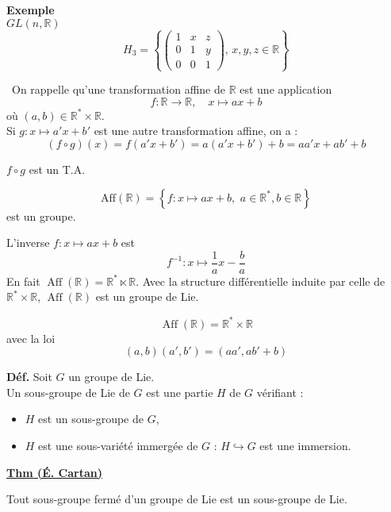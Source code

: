 \documentclass[11pt,a4paper]{article}
\begin{document}
	\medskip
	
	\noindent
	\textbf{Exemple} \\
	$GL(n, \mathbb{R})$ \\
	\[
	H_3 = \left\lbrace
	\begin{pmatrix}
		1 & x & z \\
		0 & 1 & y \\
		0 & 0 & 1
	\end{pmatrix} ,\, x, y, z \in \mathbb{R}
	\right\rbrace
	\]
	\medskip
	
	\noindent
	\textasteriskcentered~On rappelle qu'une transformation affine de $\mathbb{R}$ est une application
	\[
	f : \mathbb{R} \longrightarrow \mathbb{R}, \quad x \mapsto ax + b
	\]
	où $(a, b) \in \mathbb{R}^* \times \mathbb{R}$.
	\\
	Si $g : x \mapsto a'x + b'$ est une autre transformation affine, on a :
	\[
	(f \circ g)(x) = f(a'x + b') = a(a'x + b') + b = aa'x + ab' + b
	\]
	\medskip
	
	$f \circ g$ est un T.A.
	
	\[
	\text{Aff}(\mathbb{R}) = \left\lbrace f : x \mapsto ax + b,\,\, a \in \mathbb{R}^*, b \in \mathbb{R} \right\rbrace
	\]
	est un groupe.
	
	L'inverse $f : x \mapsto a x + b$ est
	\[
	f^{-1} : x \mapsto \frac{1}{a}x - \frac{b}{a}
	\]
	En fait $\operatorname{Aff}(\mathbb{R}) = \mathbb{R}^* \ltimes \mathbb{R}$. Avec la structure différentielle induite par celle de $\mathbb{R}^* \times \mathbb{R}$, $\operatorname{Aff}(\mathbb{R})$ est un groupe de Lie.
	
	\[
	\operatorname{Aff}(\mathbb{R}) = \mathbb{R}^* \times \mathbb{R}
	\]
	avec la loi
	\[
	(a, b) (a', b') = (a a', a b' + b)
	\]
	
	\textbf{Déf.} Soit $G$ un groupe de Lie.\\
	Un sous-groupe de Lie de $G$ est une partie $H$ de $G$ vérifiant :
	\begin{itemize}
		\item $H$ est un sous-groupe de $G$,
		\item $H$ est une sous-variété immergée de $G$ : $H \hookrightarrow G$ est une immersion.
	\end{itemize}
	
	\textbf{\underline{Thm (É. Cartan)}}
	
	\vspace{1em}
	
	Tout sous-groupe fermé d'un groupe de Lie est un sous-groupe de Lie.
	
\end{document}
